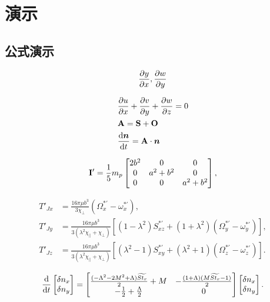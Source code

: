 \chapter{演示}
\vspace{7pt}
\section{公式演示}
\begin{equation}
	\ppx{y}, \ppx[y]{w}
\end{equation}

\begin{equation}
	\begin{split}
		&\ppx{u}+\ppx[y]{v}+\ppx[z]{w}=0\\
		&\ma A=\ma S+\ma O\\
		&\dt{\ve n}=\ma A \cdot \ve n
	\end{split}
\end{equation}

\begin{equation}
	\ma I'=\frac{1}{5}m_p\left[\begin{matrix}
		2b^2&0&0\\
		0&a^2+b^2&0\\
		0&0&a^2+b^2
	\end{matrix}\right],
\end{equation}

\newcommand\Stt{\widetilde{St_r}}
\newcommand{\Stc}{St_r C_\perp}
\newcommand{\Stcp}{St_r C_\parallel}
\newcommand{\halfof}[1]{\frac{#1}{2}}
\newcommand{\uhs}{\hat{\ve u}_s}
\newcommand{\kc}{k_\perp}
\newcommand{\kp}{k_\parallel}
\newcommand{\chic}{\chi_\perp}
\newcommand{\chip}{\chi_\parallel}

\begin{equation}
	\begin{split}
		T'_{J x} &=\frac{16\pi\mu b^3}{3\chic}(\Omega^{*\prime}_x-\omega^{*\prime}_x),\\
		T'_{J y} &=\frac{16\pi\mu b^3}{3(\lambda^2\chip+\chic)}[(1-\lambda^2)S^{*\prime}_{xz}+(1+\lambda^2)(\Omega^{*\prime}_y-\omega^{*\prime}_y)],\\
		T'_{J z} &=\frac{16\pi\mu b^3}{3(\lambda^2\chip+\chic)}[(\lambda^2-1)S^{*\prime}_{xy}+(\lambda^2+1)(\Omega^{*\prime}_z-\omega^{*\prime}_z)].
	\end{split}
\end{equation}

\begin{equation}
	\dt{}\left[\begin{matrix}
		\delta n_x\\\delta n_y\\
	\end{matrix}\right]=\left[\begin{matrix}
		\halfof{(-\Lambda^2-2M^2+\Lambda)\Stt}+M & -\halfof{(1+\Lambda)(M\Stt-1)}\\
		-\halfof{1}+\halfof{\Lambda}&0\\
	\end{matrix}\right]\left[\begin{matrix}
		\delta n_x\\\delta n_y\\
	\end{matrix}\right].
\end{equation}